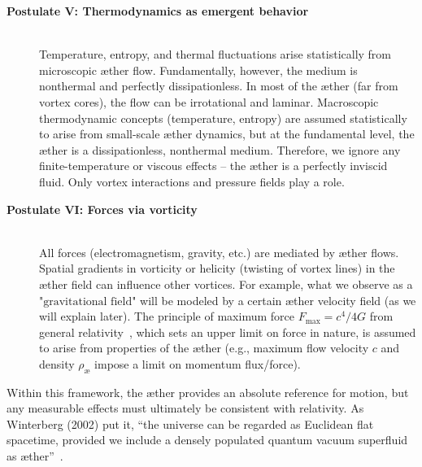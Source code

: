 \begin{description}
    \item[\textbf{Postulate V: Thermodynamics as emergent behavior}] \hfill \\
    Temperature, entropy, and thermal fluctuations arise statistically from microscopic æther flow. Fundamentally, however, the medium is nonthermal and perfectly dissipationless. In most of the æther (far from vortex cores), the flow can be irrotational and laminar. Macroscopic thermodynamic concepts (temperature, entropy) are assumed statistically to arise from small-scale æther dynamics, but at the fundamental level, the æther is a dissipationless, nonthermal medium. Therefore, we ignore any finite-temperature or viscous effects – the æther is a perfectly inviscid fluid. Only vortex interactions and pressure fields play a role.

    \item[\textbf{Postulate VI: Forces via vorticity}] \hfill \\
    All forces (electromagnetism, gravity, etc.) are mediated by æther flows.
    Spatial gradients in vorticity or helicity (twisting of vortex lines) in the æther field can influence other vortices. For example, what we observe as a $\text{"gravitational field"}$ will be modeled by a certain æther velocity field (as we will explain later). The principle of maximum force $ F_\text{max} = c^4 / 4 G $ from general relativity~\cite{Schiller2022-maxforce}, which sets an upper limit on force in nature, is assumed to arise from properties of the æther (e.g., maximum flow velocity $c$ and density $\rho_\text{\ae}$ impose a limit on momentum flux/force).
\end{description}

Within this framework, the æther provides an absolute reference for motion, but any measurable effects must ultimately be consistent with relativity. As Winterberg (2002) put it, ``the universe can be regarded as Euclidean flat spacetime, provided we include a densely populated quantum vacuum superfluid as æther''~\cite{Winterberg2002-PlanckAether}.

